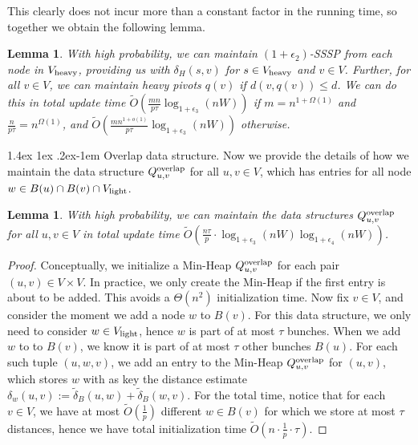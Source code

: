 \documentclass[11pt]{article}
\makeatletter
\newtheorem{lemma}[theorem]{Lemma}
\theoremstyle{definition}
\theoremstyle{remark}
\renewcommand{\paragraph}{%
  \@startsection{paragraph}{4}%
  {\z@}{1.4ex \@plus 1ex \@minus .2ex}{-1em}%
  {\normalfont\normalsize\bfseries}%
}
\makeatother
\begin{document}
\begin{titlepage}
This clearly does not incur more than a constant factor in the running time, so together we obtain the following lemma. 

\begin{lemma} \label{lm:heavy_MSSP}
    With high probability, we can maintain $(1+\epsilon_2)$-SSSP from each node in $ V_{\rm{heavy}} $, providing us with $\delta_H(s,v)$ for $s\in V_{\rm{heavy}}$ and $v\in V$. Further, for all $v\in V$, we can maintain heavy pivots $q(v)$ if $d(v,q(v))\leq d$. We can do this in total update time $ \tilde O (\tfrac{m n }{p\tau}\log_{1+\epsilon_3}(nW)) $ if $m=n^{1+\Omega(1)}$ and $\tfrac{n}{p\tau}=n^{\Omega(1)}$, and $ \tilde O (\tfrac{m n^{1+o(1)} }{p\tau}\log_{1+\epsilon_3}(nW)) $ otherwise. 
\end{lemma}


\paragraph{Overlap data structure.}
Now we provide the details of how we maintain the data structure $Q^{\rm{overlap}}_{u,v}$ for all $u,v\in V$, which has entries for all node $w\in B(u)\cap B(v)\cap V_{\rm{light}}$.




\begin{lemma}\label{lm:min_heap_w}
   With high probability, we can maintain the data structures $Q^{\rm{overlap}}_{u,v}$ for all $u,v\in V$ in total update time $\tilde O (\tfrac{n\tau }{p} \cdot\log_{1+\epsilon_3}(nW)\log_{1+\epsilon_4}(nW)) $.
\end{lemma}
\begin{proof}
    Conceptually, we initialize a Min-Heap $Q^{\rm{overlap}}_{u,v}$ for each pair $(u,v)\in V\times V$. In practice, we only create the Min-Heap if the first entry is about to be added. This avoids a $\Theta(n^2)$ initialization time. Now fix $v\in V$, and consider the moment we add a node $w$ to $B(v)$. For this data structure, we only need to consider $w\in V_{\rm{light}}$, hence $w$ is part of at most $ \tau $ bunches. When we add $w$ to to $B(v)$, we know it is part of at most $\tau$ other bunches $B(u)$. For each such tuple $(u,w,v)$, we add an entry to the Min-Heap $Q^{\rm{overlap}}_{u,v}$ for $(u,v)$, which stores $w$ with as key the distance estimate $\delta_w(u,v):=\tilde\delta_B(u,w)+\tilde\delta_B(w,v)$. For the total time, notice that for each $v\in V$, we have at most $\tilde O(\tfrac{1}{p})$ different $w\in B(v)$ for which we store at most $\tau$ distances, hence we have total initialization time $ \tilde O (n \cdot \tfrac{1}{p} \cdot \tau) $.
    

\end{proof}
\end{titlepage}
\end{document}
